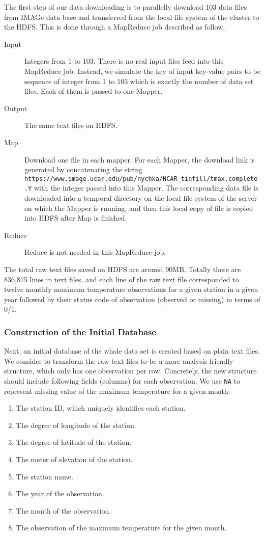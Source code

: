 The first step of our 
data downloading is to parallelly download 103 data files from IMAGe data base and 
transferred from the local file system of the cluster to the HDFS. This is done
through a MapReduce job described as follow.
\begin{description}
  \item[Input] Integers from 1 to 103. There is no real input files feed into this
  MapReduce job. Instead, we simulate the key of input key-value pairs to be
  sequence of integer from 1 to 103 which is exactly the number of data set files. 
  Each of them is passed to one Mapper. 
  \item[Output] The same text files on HDFS.
  \item[Map] Download one file in each mapper. For each Mapper, the download link
  is generated by concatenating the string\\
  \texttt{https://www.image.ucar.edu/pub/nychka/NCAR\_tinfill/tmax.complete.Y}
  with the integer passed into this Mapper. The corresponding data file is
  downloaded into a temporal directory on the local file system of the server on 
  which the Mapper is running, and then this local copy of file is copied 
  into HDFS after Map is finished.  
  \item[Reduce] Reduce is not needed in this MapReduce job.
\end{description}
The total raw text files saved on HDFS are around 90MB. Totally there are 836,875 
lines in text files, and each line of the raw text file corresponded to twelve
monthly maximum temperature observations for a given station in a given year
followed by their status code of observation (observed or missing) in terms of 0/1.

\subsubsection{Construction of the Initial Database}

Next, an initial database of the whole data set is created based on plain text
files. We consider to transform the raw text files to be a more
analysis friendly structure, which only has one observation per row. Concretely,
the new structure should include following fields (columns) for each observation.
We use \texttt{NA} to represent missing value of the maximum temperature for a
given month:

\begin{enumerate}
  \item The station ID, which uniquely identifies each station.
  \item The degree of longitude of the station.
  \item The degree of latitude of the station.
  \item The meter of elevation of the station.
  \item The station name.
  \item The year of the observation.
  \item The month of the observation.
  \item The observation of the maximum temperature for the given month.
\end{enumerate}

